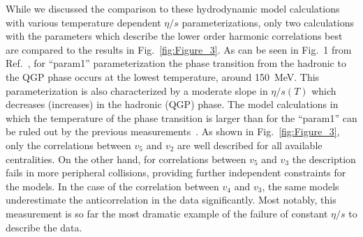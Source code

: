 While we discussed the comparison to these hydrodynamic model calculations with various temperature dependent $\eta/s$ parameterizations, only two calculations with the parameters which describe the lower order harmonic correlations best are compared to the results in Fig.~\ref{fig:Figure_3}. 
As can be seen in Fig.~1 from Ref.~\cite{Niemi:2015qia}, for ``param1'' parameterization the phase transition from the hadronic to the QGP phase occurs at the lowest temperature, around 150~MeV. This parameterization is also characterized by a moderate slope in $\eta/s(T)$ which decreases (increases) in the hadronic (QGP) phase.
The model calculations in which the temperature of the phase transition is larger than for the ``param1'' can be ruled out by the previous measurements~\cite{ALICE:2016kpq}.
As shown in Fig.~\ref{fig:Figure_3}, only the correlations between $v_5$ and $v_2$ are well described for all available centralities. 
On the other hand, for correlations between $v_5$ and $v_3$ the description fails in more peripheral collisions, providing further independent constraints for the models.
In the case of the correlation between $v_4$ and $v_3$, the same models underestimate the anticorrelation in the data significantly.
Most notably, this measurement is so far the most dramatic example of the failure of constant $\eta/s$ to describe the data.

